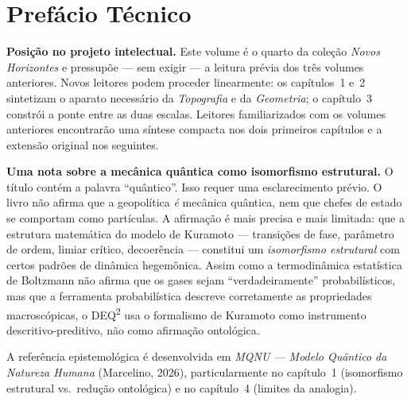 \documentclass[12pt, twoside]{book}
\theoremstyle{plain}
\theoremstyle{definition}
\theoremstyle{remark}
\begin{document}
\tableofcontents
\cleardoublepage

\chapter*{Pref\'{a}cio T\'{e}cnico}

\textbf{Posi\c{c}\~{a}o no projeto intelectual.}
Este volume \'{e} o quarto da cole\c{c}\~{a}o \textit{Novos Horizontes} e pressup\~{o}e --- sem exigir --- a leitura pr\'{e}via dos tr\^{e}s volumes anteriores. Novos leitores podem proceder linearmente: os cap\'{i}tulos~1 e~2 sintetizam o aparato necess\'{a}rio da \textit{Topografia} e da \textit{Geometria}; o cap\'{i}tulo~3 constr\'{o}i a ponte entre as duas escalas. Leitores familiarizados com os volumes anteriores encontrar\~{a}o uma s\'{i}ntese compacta nos dois primeiros cap\'{i}tulos e a extens\~{a}o original nos seguintes.

\textbf{Uma nota sobre a mec\^{a}nica qu\^{a}ntica como isomorfismo estrutural.}
O t\'{i}tulo cont\'{e}m a palavra ``qu\^{a}ntico''. Isso requer uma esclareci\-mento pr\'{e}vio. O livro n\~{a}o afirma que a geopol\'{i}tica \textit{\'{e}} mec\^{a}nica qu\^{a}ntica, nem que chefes de estado se comportam como part\'{i}culas. A afirma\c{c}\~{a}o \'{e} mais precisa e mais limitada: que a estrutura matem\'{a}tica do modelo de Kuramoto --- transi\c{c}\~{o}es de fase, par\^{a}metro de ordem, limiar cr\'{i}tico, decoer\^{e}ncia --- constitui um \textit{isomorfismo estrutural} com certos padr\~{o}es de din\^{a}mica hegem\^{o}nica. Assim como a termodin\^{a}mica estat\'{i}stica de Boltzmann n\~{a}o afirma que os gases sejam ``verdadeiramente'' probabil\'{i}sticos, mas que a ferramenta probabil\'{i}stica descreve corretamente as propriedades macrosc\'{o}picas, o DEQ\textsuperscript{2} usa o formalismo de Kuramoto como instrumento descritivo-preditivo, n\~{a}o como afirma\c{c}\~{a}o ontol\'{o}gica.

A refer\^{e}ncia epistemol\'{o}gica \'{e} desenvolvida em \textit{MQNU --- Modelo Qu\^{a}ntico da Natureza Humana} (Marcelino, 2026), particularmente no cap\'{i}tulo~1 (isomorfismo estrutural vs.\ redu\c{c}\~{a}o ontol\'{o}gica) e no cap\'{i}tulo~4 (limites da analogia).
\end{document}
